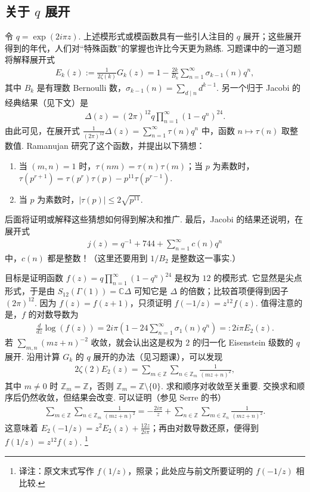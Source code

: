 \subsection{关于 $q$ 展开}\label{sec:modular-1-2-5}
令 $q=\exp(2i\pi z)$. 上述模形式或模函数具有一些引人注目的 $q$ 展开；这些展开得到的年代，人们对``特殊函数''的掌握也许比今天更为熟练. 习题课中的一道习题将解释展开式
\begin{align*}
E_k(z):=\frac{1}{2\zeta(k)}G_k(z)=1-\frac{2k}{B_k}\sum_{n=1}^\infty\sigma_{k-1}(n)q^n,
\end{align*}
其中 $B_k$ 是有理数 Bernoulli 数，$\sigma_{k-1}(n)=\sum_{d\mid n}d^{k-1}$. 另一个归于 Jacobi 的经典结果（见下文）是
\begin{align*}
\Delta(z)=(2\pi)^{12}q\prod_{n=1}^\infty(1-q^n)^{24}.
\end{align*}
由此可见，在展开式 $\frac{1}{(2\pi)^{12}}\Delta(z)=\sum_{n=1}^\infty\tau(n)q^n$ 中，函数 $n\mapsto\tau(n)$ 取整数值. Ramanujan 研究了这个函数，并提出以下猜想：
\begin{enumerate}[label=\roman*)]
\item 当 $(m,n)=1$ 时，$\tau(nm)=\tau(n)\tau(m)$；当 $p$ 为素数时，$\tau(p^{r+1})=\tau(p^r)\tau(p)-p^{11}\tau(p^{r-1})$.
\item 当 $p$ 为素数时，$|\tau(p)|\leqslant2\sqrt{p^{11}}$.
\end{enumerate}
后面将证明或解释这些猜想如何得到解决和推广. 最后，Jacobi 的结果还说明，在展开式
\begin{align*}
j(z)=q^{-1}+744+\sum_{n=1}^\infty c(n)q^n
\end{align*}
中，$c(n)$ 都是整数！（这里还要用到 $1/B_2$ 是整数这一事实.）
\begin{remark*}
目标是证明函数 $f(z)=q\prod_{n=1}^\infty(1-q^n)^{24}$ 是权为 $12$ 的模形式. 它显然是尖点形式，于是由 $S_{12}(\Gamma(1))=\mathbb C\Delta$ 可知它是 $\Delta$ 的倍数；比较首项便得到因子 $(2\pi)^{12}$. 因为 $f(z)=f(z+1)$，只须证明 $f(-1/z)=z^{12}f(z)$. 值得注意的是，$f$ 的对数导数为
\begin{align*}
\frac{d}{dz}\log(f(z))=2i\pi\left(1-24\sum_{n=1}^\infty\sigma_1(n)q^n\right)=:2i\pi E_2(z).
\end{align*}
若 $\sum_{m,n}(mz+n)^{-2}$ 收敛，就会认出这是权为 $2$ 的归一化 Eisenstein 级数的 $q$ 展开. 沿用计算 $G_k$ 的 $q$ 展开的办法（见习题课），可以发现
\begin{align*}
2\zeta(2)E_2(z)=\sum_{m\in\mathbb Z}\sum_{n\in\mathbb Z_m}\frac{1}{(mz+n)^2},
\end{align*}
其中 $m\ne0$ 时 $\mathbb Z_m=\mathbb Z$，否则 $\mathbb Z_m=\mathbb Z\setminus\{0\}$. 求和顺序对收敛至关重要. 交换求和顺序后仍然收敛，但结果会改变. 可以证明（参见 Serre 的书）
\begin{align*}
\sum_{m\in\mathbb Z}\sum_{n\in\mathbb Z_m}\frac{1}{(mz+n)^2}=-\frac{2i\pi}{z}+\sum_{n\in\mathbb Z}\sum_{m\in\mathbb Z_n}\frac{1}{(mz+n)^2}.
\end{align*}
这意味着 $E_2(-1/z)=z^2E_2(z)+\frac{12z}{2i\pi}$；再由对数导数还原，便得到 $f(1/z)=z^{12}f(z)$.
\footnote{译注：原文末式写作 $f(1/z)$，照录；此处应与前文所要证明的 $f(-1/z)$ 相比较.}
\end{remark*}
